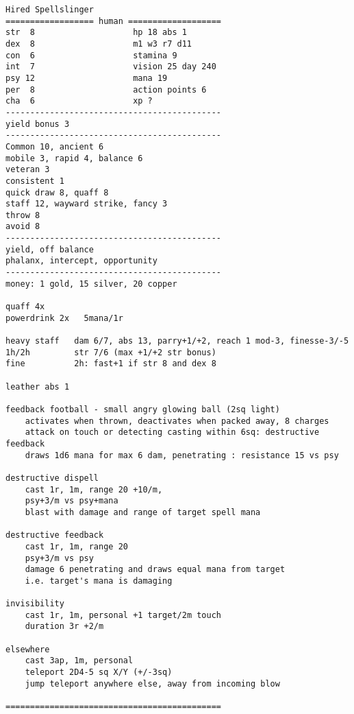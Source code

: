 \goodbreak \small \begin{samepage} \begin{verbatim}
Hired Spellslinger
================== human ===================
str  8                    hp 18 abs 1
dex  8                    m1 w3 r7 d11
con  6                    stamina 9
int  7                    vision 25 day 240
psy 12                    mana 19
per  8                    action points 6
cha  6                    xp ?
--------------------------------------------
yield bonus 3
--------------------------------------------
Common 10, ancient 6
mobile 3, rapid 4, balance 6
veteran 3
consistent 1
quick draw 8, quaff 8
staff 12, wayward strike, fancy 3
throw 8
avoid 8
--------------------------------------------
yield, off balance
phalanx, intercept, opportunity
--------------------------------------------
money: 1 gold, 15 silver, 20 copper

quaff 4x
powerdrink 2x   5mana/1r

heavy staff   dam 6/7, abs 13, parry+1/+2, reach 1 mod-3, finesse-3/-5
1h/2h         str 7/6 (max +1/+2 str bonus)
fine          2h: fast+1 if str 8 and dex 8

leather abs 1

feedback football - small angry glowing ball (2sq light)
    activates when thrown, deactivates when packed away, 8 charges
    attack on touch or detecting casting within 6sq: destructive feedback
    draws 1d6 mana for max 6 dam, penetrating : resistance 15 vs psy

destructive dispell
    cast 1r, 1m, range 20 +10/m, 
    psy+3/m vs psy+mana
    blast with damage and range of target spell mana

destructive feedback
    cast 1r, 1m, range 20
    psy+3/m vs psy
    damage 6 penetrating and draws equal mana from target
    i.e. target's mana is damaging

invisibility
    cast 1r, 1m, personal +1 target/2m touch
    duration 3r +2/m

elsewhere
    cast 3ap, 1m, personal
    teleport 2D4-5 sq X/Y (+/-3sq)
    jump teleport anywhere else, away from incoming blow

============================================
\end{verbatim} \end{samepage} \normalsize

\flushbottom





























